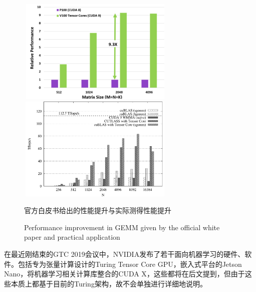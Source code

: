 \begin{figure}
	\centering
	\includegraphics[width=7.5cm,height=5cm]{figures/VoltaGemmPerf.jpg}
	\includegraphics[width=7.5cm,height=5cm]{figures/ActualGemmPerf.jpg}
	\renewcommand{\thefigure}{\arabic{section}-\arabic{figure} }
	\renewcommand{\figurename}{图}
	\caption{官方白皮书给出的性能提升与实际测得性能提升\cite{TFCOMPARE}}
	\addtocounter{figure}{-1}
	\renewcommand{\thefigure}{\arabic{section}-\arabic{figure} }
	\renewcommand{\figurename}{Figure}
	\caption{Performance improvement in GEMM given by the official white paper and practical application}
	\label{fig.PerfCompare}
\end{figure}
\par 在最近刚结束的GTC 2019会议中，NVIDIA发布了若干面向机器学习的硬件、软件。包括专为张量计算设计的Turing Tensor Core GPU，嵌入式平台的Jetson Nano\cite{JETSONNANO}，将机器学习相关计算库整合的CUDA X\cite{CUDAX}，这些都将在后文提到，但由于这些本质上都基于目前的Turing架构，故不会单独进行详细地说明。
